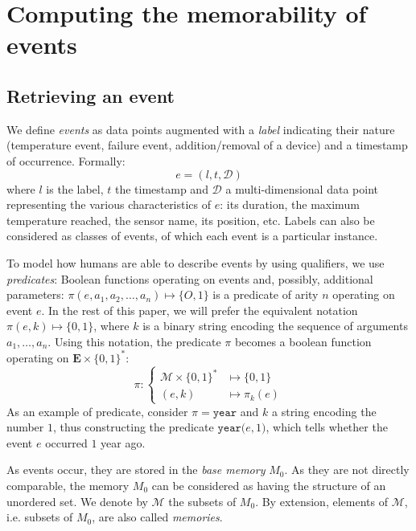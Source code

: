 \documentclass[conference]{IEEEtran}
\begin{document}
\section{Computing the memorability of events}
\label{sec:computing}
\subsection{Retrieving an event}

We define \emph{events} as data points augmented with a \emph{label} indicating their nature (temperature event, failure event, addition/removal of a device) and a timestamp of occurrence. Formally:
\begin{equation}
  \label{eq:event}
  e = (l, t,\mathcal{D})
\end{equation}
where $l$ is the label, $t$ the timestamp and $\mathcal{D}$ a multi-dimensional data point representing the various characteristics of $e$: its duration, the maximum temperature reached, the sensor name, its position, etc. Labels can also be considered as classes of events, of which each event is a particular instance.

To model how humans are able to describe events by using qualifiers, we use \emph{predicates}: Boolean functions operating on events and, possibly, additional parameters: $\pi(e, a_1, a_2, \dots, a_n) \mapsto \{O,1\}$ is a predicate of arity $n$ operating on event $e$. In the rest of this paper, we will prefer the equivalent notation $\pi(e, k) \mapsto \{0,1\}$, where $k$ is a binary string encoding the sequence of arguments $a_1, \dots, a_n$. Using this notation, the predicate $\pi$ becomes a boolean function operating on $\mathbf{E} \times \{0,1\}^*$:
\begin{equation}
  \label{eq:predicate}
  \pi : \begin{cases}
\mathcal{M}\times \{0,1\}^{*} &\mapsto \{0,1\} \\
(e, k) &\mapsto \pi_{k}(e)
\end{cases}
\end{equation}
As an example of predicate, consider $\pi = \mathtt{year}$ and $k$ a string encoding the number $1$, thus
constructing the predicate $\mathtt{year(}e, 1\mathtt{)}$, which tells whether
the event $e$ occurred $1$ year ago.

As events occur, they are stored in the  \emph{base memory} $M_0$. As they are not directly comparable, the memory $M_0$ can be considered as having the structure of an unordered set. We denote by $\mathcal{M}$ the subsets of $M_0$. By extension, elements of $\mathcal{M}$, i.e. subsets of $M_0$, are also called \emph{memories}.
\end{document}
